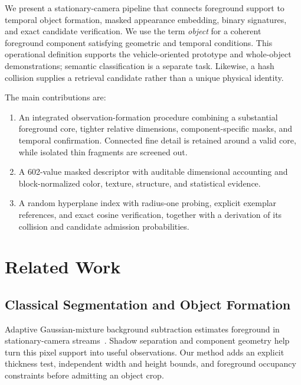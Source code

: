 \documentclass[conference]{IEEEtran}
\begin{document}
We present a stationary-camera pipeline that connects foreground support to temporal object formation, masked appearance embedding, binary signatures, and exact candidate verification. We use the term \emph{object} for a coherent foreground component satisfying geometric and temporal conditions. This operational definition supports the vehicle-oriented prototype and whole-object demonstrations; semantic classification is a separate task. Likewise, a hash collision supplies a retrieval candidate rather than a unique physical identity.

The main contributions are:
\begin{enumerate}
\item An integrated observation-formation procedure combining a substantial foreground core, tighter relative dimensions, component-specific masks, and temporal confirmation. Connected fine detail is retained around a valid core, while isolated thin fragments are screened out.
\item A 602-value masked descriptor with auditable dimensional accounting and block-normalized color, texture, structure, and statistical evidence.
\item A random hyperplane index with radius-one probing, explicit exemplar references, and exact cosine verification, together with a derivation of its collision and candidate admission probabilities.
\end{enumerate}

\section{Related Work}
\subsection{Classical Segmentation and Object Formation}
Adaptive Gaussian-mixture background subtraction estimates foreground in stationary-camera streams~\cite{zivkovic2004,opencvmog2}. Shadow separation and component geometry help turn this pixel support into useful observations. Our method adds an explicit thickness test, independent width and height bounds, and foreground occupancy constraints before admitting an object crop.
\end{document}
